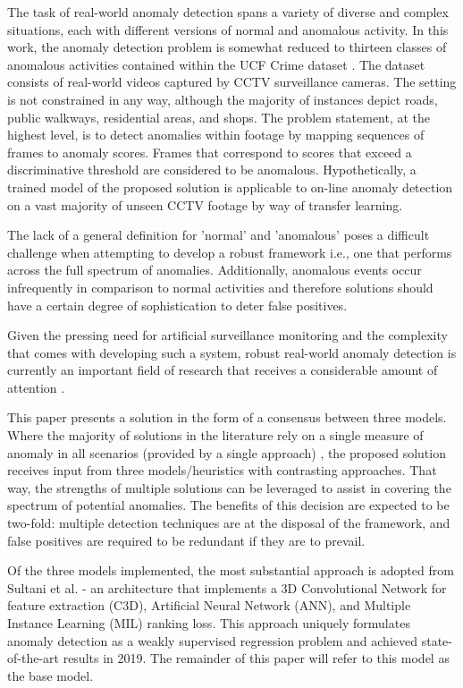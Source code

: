 \documentclass[sigplan,authorversion,nonacm, 9pt]{acmart}
\begin{document}
The task of real-world anomaly detection spans a variety of diverse and complex situations, each with different versions of normal and anomalous activity. In this work, the anomaly detection problem is somewhat reduced to thirteen classes of anomalous activities contained within the UCF Crime dataset \cite{dataset}. The dataset consists of real-world videos captured by CCTV surveillance cameras. The setting is not constrained in any way, although the majority of instances depict roads, public walkways, residential areas, and shops. The problem statement, at the highest level, is to detect anomalies within footage by mapping sequences of frames to anomaly scores. Frames that correspond to scores that exceed a discriminative threshold are considered to be anomalous. Hypothetically, a trained model of the proposed solution is applicable to on-line anomaly detection on a vast majority of unseen CCTV footage by way of transfer learning. 
\par
The lack of a general definition for 'normal' and 'anomalous' poses a difficult challenge when attempting to develop a robust framework i.e., one that performs across the full spectrum of anomalies. 
Additionally, anomalous events occur infrequently in comparison to normal activities and therefore solutions should have a certain degree of sophistication to deter false positives.
\par
Given the pressing need for artificial surveillance monitoring and the complexity that comes with developing such a system, robust real-world anomaly detection is currently an important field of research that receives a considerable amount of attention \cite{sultani} \cite{wang} \cite{nguyen} \cite{park} \cite{feng} \cite{liu}. 
\par
This paper presents a solution in the form of a consensus between three models. 
Where the majority of solutions in the literature rely on a single measure of anomaly in all scenarios (provided by a single approach) \cite{sultani} \cite{nguyen} \cite{park} \cite{liu}, the proposed solution receives input from three models/heuristics with contrasting approaches. That way, the strengths of multiple solutions can be leveraged to assist in covering the spectrum of potential anomalies. The benefits of this decision are expected to be two-fold: multiple detection techniques are at the disposal of the framework, and false positives are required to be redundant if they are to prevail.
\par
Of the three models implemented, the most substantial approach is adopted from Sultani et al. \cite{sultani} - an architecture that implements a 3D Convolutional Network for feature extraction (C3D), Artificial Neural Network (ANN), and Multiple Instance Learning (MIL) ranking loss. This approach uniquely formulates anomaly detection as a weakly supervised regression problem and achieved state-of-the-art results in 2019. The remainder of this paper will refer to this model as the base model.
\end{document}
